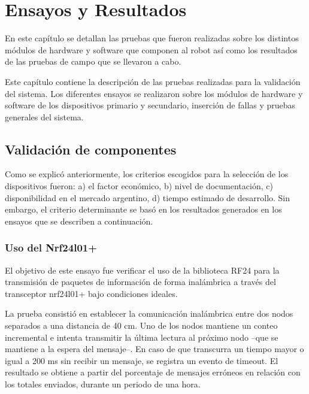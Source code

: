 
\chapter{Ensayos y Resultados} %

\label{Chapter4} %


En este capítulo se detallan las pruebas que fueron realizadas sobre los distintos
módulos de hardware y software que componen al robot así como los resultados
de las pruebas de campo que se llevaron a cabo.

Este capítulo contiene la  descripción de las pruebas realizadas para la validación del sistema. Los diferentes ensayos se realizaron sobre los módulos de hardware y software de los dispositivos primario y secundario, inserción  de fallas y pruebas generales del sistema.

\section{Validación de componentes}
\label{sec:validacion_componentes}

Como se explicó anteriormente, los criterios escogidos para la selección de los dispositivos fueron: a) el factor económico, b) nivel de documentación, c) disponibilidad en el mercado argentino, d) tiempo estimado de desarrollo. Sin embargo, el criterio determinante se basó en los resultados generados en los ensayos que se describen a continuación.

\subsection{Uso del Nrf24l01+}

El objetivo de este ensayo fue verificar el uso de la biblioteca RF24 para la transmisión de paquetes de información de forma inalámbrica a través del transceptor nrf24l01+ bajo condiciones ideales.

La prueba consistió  en establecer la comunicación inalámbrica entre dos nodos separados a una distancia de 40 cm. Uno de los nodos mantiene un conteo incremental e intenta transmitir la última lectura al próximo nodo --que se mantiene a la espera del mensaje--. En caso de que transcurra un tiempo mayor o igual a 200 ms sin recibir un mensaje, se registra un evento de timeout. El resultado se obtiene a partir del porcentaje de mensajes erróneos en relación con los totales enviados, durante un periodo de una hora.

